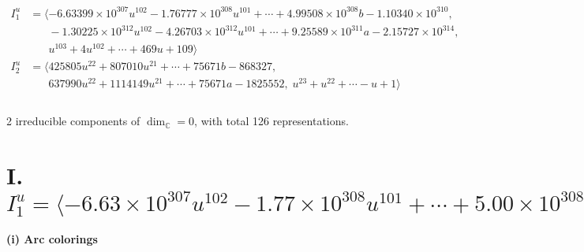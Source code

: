 \documentclass[1p]{elsarticle_modified}
\theoremstyle{definition}
\begin{document}
\begin{align*}
I^u_{1}&=\langle 
-6.63399\times10^{307} u^{102}-1.76777\times10^{308} u^{101}+\cdots+4.99508\times10^{308} b-1.10340\times10^{310},\\
\phantom{I^u_{1}}&\phantom{= \langle  }-1.30225\times10^{312} u^{102}-4.26703\times10^{312} u^{101}+\cdots+9.25589\times10^{311} a-2.15727\times10^{314},\\
\phantom{I^u_{1}}&\phantom{= \langle  }u^{103}+4 u^{102}+\cdots+469 u+109\rangle \\
I^u_{2}&=\langle 
425805 u^{22}+807010 u^{21}+\cdots+75671 b-868327,\\
\phantom{I^u_{2}}&\phantom{= \langle  }637990 u^{22}+1114149 u^{21}+\cdots+75671 a-1825552,\;u^{23}+u^{22}+\cdots- u+1\rangle \\
\\
\end{align*}
\raggedright * 2 irreducible components of $\dim_{\mathbb{C}}=0$, with total 126 representations.\\
\newpage
\renewcommand{\arraystretch}{1}
\centering \section*{I. $I^u_{1}= \langle -6.63\times10^{307} u^{102}-1.77\times10^{308} u^{101}+\cdots+5.00\times10^{308} b-1.10\times10^{310},\;-1.30\times10^{312} u^{102}-4.27\times10^{312} u^{101}+\cdots+9.26\times10^{311} a-2.16\times10^{314},\;u^{103}+4 u^{102}+\cdots+469 u+109 \rangle$}
\flushleft \textbf{(i) Arc colorings}\\
\end{document}
